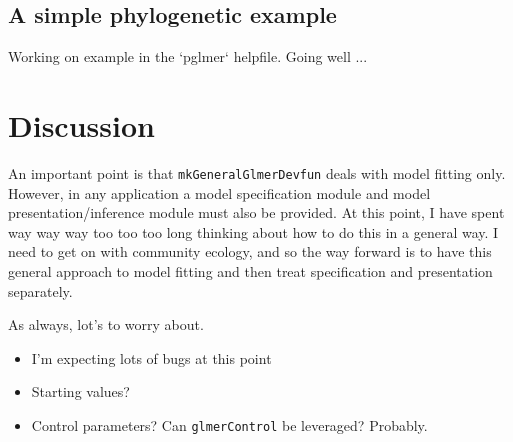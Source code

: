 \documentclass[12pt]{article}\usepackage[]{graphicx}\usepackage[]{color}
\begin{document}
\subsection{A simple phylogenetic example}

Working on example in the `pglmer` helpfile.  Going well ...


\section{Discussion}

An important point is that \texttt{mkGeneralGlmerDevfun} deals with
model fitting only.  However, in any application a model specification
module and model presentation/inference module must also be provided.
At this point, I have spent way way way too too too long thinking
about how to do this in a general way.  I need to get on with
community ecology, and so the way forward is to have this general
approach to model fitting and then treat specification and
presentation separately.

As always, lot's to worry about.
\begin{itemize}
\item I'm expecting lots of bugs at this point
\item Starting values?
\item Control parameters?  Can \texttt{glmerControl} be leveraged?
  Probably.
\end{itemize}
\end{document}

